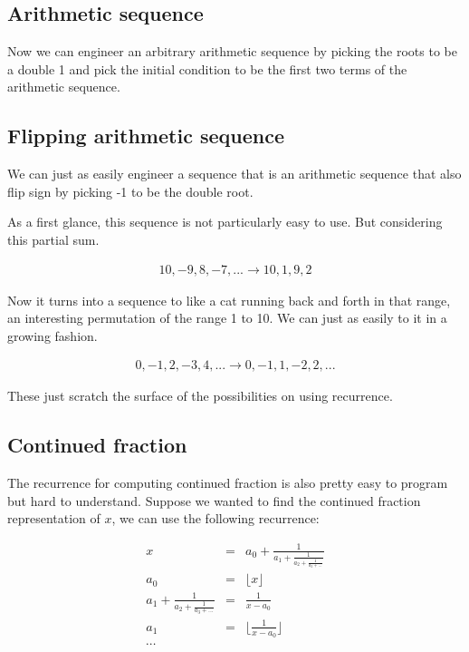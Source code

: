 \documentclass{article}
\begin{document}
\subsection*{Arithmetic sequence}
Now we can engineer an arbitrary arithmetic sequence by picking the roots to be a double 1 and pick the initial condition to be the first two terms of the arithmetic sequence.

\subsection*{Flipping arithmetic sequence}
We can just as easily engineer a sequence that is an arithmetic sequence that also flip sign by picking -1 to be the double root.

As a first glance, this sequence is not particularly easy to use. But considering this partial sum.

\begin{eqnarray*}
10,-9,8,-7,... \to 10,1,9,2
\end{eqnarray*}

Now it turns into a sequence to like a cat running back and forth in that range, an interesting permutation of the range 1 to 10. We can just as easily to it in a growing fashion.

\begin{eqnarray*}
0,-1,2,-3,4,... \to 0,-1,1,-2,2,...
\end{eqnarray*}

These just scratch the surface of the possibilities on using recurrence.

\subsection*{Continued fraction}

The recurrence for computing continued fraction is also pretty easy to program but hard to understand. Suppose we wanted to find the continued fraction representation of $ x $, we can use the following recurrence:

\begin{eqnarray*}
    x &=& a_0 + \frac{1}{a_1 + \frac{1}{a_2 + \frac{1}{a_3 + ...}}} \\
  a_0 &=& \lfloor x \rfloor \\
  a_1 + \frac{1}{a_2 + \frac{1}{a_3 + ...}} &=& \frac{1}{x - a_0} \\
  a_1 &=& \lfloor \frac{1}{x - a_0} \rfloor \\
  \cdots
\end{eqnarray*}
\end{document}
